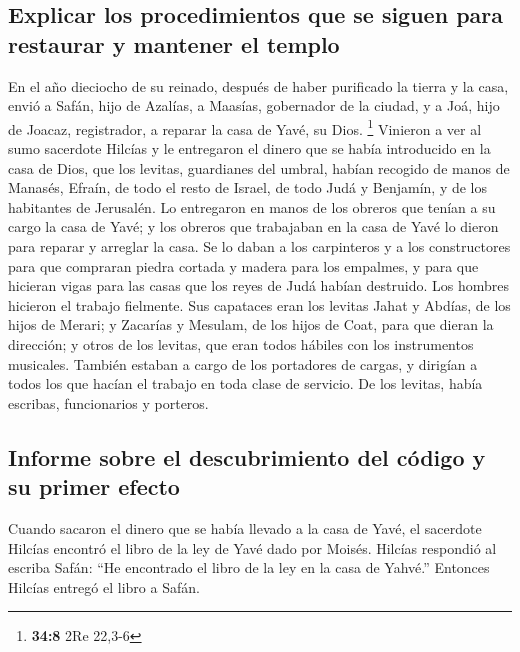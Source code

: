 \begin{paracol}{2}
{\subsection{Explicar los procedimientos que se siguen para restaurar y
mantener el
templo}\label{explicar-los-procedimientos-que-se-siguen-para-restaurar-y-mantener-el-templo}}

 En el año dieciocho de su reinado, después de haber
purificado la tierra y la casa, envió a Safán, hijo de Azalías, a
Maasías, gobernador de la ciudad, y a Joá, hijo de Joacaz, registrador,
a reparar la casa de Yavé, su Dios. \footnote{\textbf{34:8} 2Re 22,3-6}
 Vinieron a ver al sumo sacerdote Hilcías y le entregaron
el dinero que se había introducido en la casa de Dios, que los levitas,
guardianes del umbral, habían recogido de manos de Manasés, Efraín, de
todo el resto de Israel, de todo Judá y Benjamín, y de los habitantes de
Jerusalén.  Lo entregaron en manos de los obreros que
tenían a su cargo la casa de Yavé; y los obreros que trabajaban en la
casa de Yavé lo dieron para reparar y arreglar la casa. 
Se lo daban a los carpinteros y a los constructores para que compraran
piedra cortada y madera para los empalmes, y para que hicieran vigas
para las casas que los reyes de Judá habían destruido. 
Los hombres hicieron el trabajo fielmente. Sus capataces eran los
levitas Jahat y Abdías, de los hijos de Merari; y Zacarías y Mesulam, de
los hijos de Coat, para que dieran la dirección; y otros de los levitas,
que eran todos hábiles con los instrumentos musicales. 
También estaban a cargo de los portadores de cargas, y dirigían a todos
los que hacían el trabajo en toda clase de servicio. De los levitas,
había escribas, funcionarios y porteros.

\hypertarget{informe-sobre-el-descubrimiento-del-cuxf3digo-y-su-primer-efecto}{%
\subsection{Informe sobre el descubrimiento del código y su primer
efecto}\label{informe-sobre-el-descubrimiento-del-cuxf3digo-y-su-primer-efecto}}

 Cuando sacaron el dinero que se había llevado a la casa
de Yavé, el sacerdote Hilcías encontró el libro de la ley de Yavé dado
por Moisés.  Hilcías respondió al escriba Safán: ``He
encontrado el libro de la ley en la casa de Yahvé.'' Entonces Hilcías
entregó el libro a Safán.


\end{paracol}
